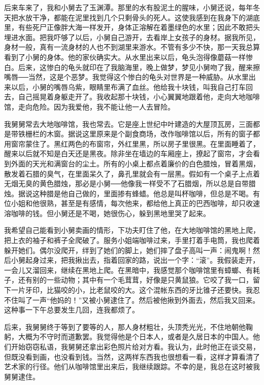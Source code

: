 后来车来了，我和小舅去了玉渊潭。那里的水有股泥土的腥味，小舅还说，每年冬天把水放干净，都能在泥里找到几个只剩骨头的死人。这使我感到在我身下的湖底里，有些死尸正像胖大海一样发开，身体正溶解在着墨绿色的水里；因此不敢把头埋进水面。把我吓够了以后，小舅自己游开，去看岸上女孩子的身材。据我所见，身材一般，真有一流身材的人也不到湖里来游水。不管有多少不快，那一天我总算看到了小舅的身体。他的家伙确实大。从水里出来以后，龟头泡得像蘑菇一样惨白。后来，这惨白的龟头就印在了我脑海里，晚上做梦，梦见小舅吻了我，醒来擦嘴唇──当然，这是个恶梦。我觉得这个惨白的龟头对世界是一种威胁。从水里出来以后，小舅的嘴唇乌紫，眼睛里布满了血丝。他给我十块钱，叫我自己打车回去，自己摇晃着身躯走开了。我收起那十块钱，小心翼翼地跟着他，走向大地咖啡馆，走向危险。因为我爱他，我不能让他一人去冒险。 

我舅舅常去大地咖啡馆，我也常去。它是座上世纪中叶建造的大屋顶瓦房，三面都是带铁栅栏的木窗。据说这里原来是个副食商场，改作咖啡馆以后，所有的窗子都用窗帘蒙住了。黑红两色的布窗帘，外红里黑，所以房子里很黑。在里面睡着了，醒来以后就不知是白天还是黑夜。除非坐在墙边的车厢座上，撩起了窗帘，才会看到外面的天光和满窗台的尘土。所有的小桌上都点着廉价的白色腊烛，冒着黑烟，散发着石腊的臭气，在里面呆久了，鼻孔里就会有一层黑。假如有一个桌子上点着无烟无臭的黄色腊烛，那必是小舅──他像我一样受不了石腊烟，所以总是自带腊烛。据说这种腊是他自己做的，里面掺有蜂蜡。他总是叫杯咖啡，但总是不喝。有位小姐和他很熟，甚至是有感情，每次他来，都给他上真正的巴西咖啡，却只收速溶咖啡的钱。但小舅还是不喝，她很伤心，躲到黑地里哭了起来。 

我希望自己能看到小舅卖画的情形，下功夫盯住了他，在大地咖啡馆的黑地上爬，把上衣的袖子和裤子全爬破了。服务小姐端咖啡过来，手里打着手电筒，我也爬着躲开她们。偶尔没爬开，绊到了她们的脚上，她们摔了盘子高叫一声：闹鬼啊！然后小舅起身过来，把我揪出去，指着回家的路，说出一个字：“滚”。我假装走开，一会儿又溜回来，继续在黑地上爬。在黑暗中，我感觉那个咖啡馆里有蟑螂、有耗子，还有别的一些动物；其中有一个毛茸茸，好像是只黄鼠狼。它咬了我一口，留下一片牙印，比猫咬的小，比老鼠咬的大。这个混帐东西的牙比锥子还要快。我忍不住叫了一声“他妈的！”又被小舅逮住了。然后被他揪到外面去，然后我又回来。这种事一下午总要发生几回，连我都烦了。 

后来，我舅舅终于等到了要等的人，那人身材粗壮，头顶秃光光，不住地朝他鞠躬，大概为不守时而道歉罢。我觉得他是个日本人，或者是久居日本的中国人。他们开始窃窃私语，我舅舅还拿出彩色照片给对方看。我认为，此时他正在谈交易，但既没看到画，也没看到钱。当然，这两样东西我也很想看一看，这样才算看清了艺术家的行径。他们从咖啡馆里出来后，我继续跟踪。不幸的是，我总在这时被我舅舅逮住。 

